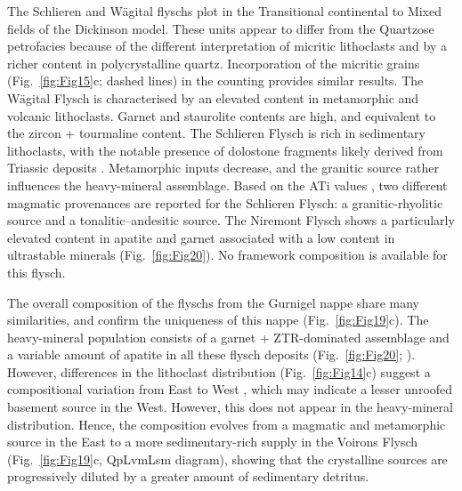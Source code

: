 \documentclass[twoside]{article}
\begin{document}
The Schlieren and Wägital flyschs plot in the Transitional continental to Mixed fields of the Dickinson model. These units appear to differ from the Quartzose petrofacies because of the different interpretation of micritic lithoclasts and by a richer content in polycrystalline quartz. Incorporation of the micritic grains (Fig.~\ref{fig:Fig15}c; dashed lines) in the counting provides similar results. The Wägital Flysch is characterised by an elevated content in metamorphic and volcanic lithoclasts. Garnet and staurolite contents are high, and equivalent to the zircon + tourmaline content. The Schlieren Flysch is rich in sedimentary lithoclasts, with the notable presence of dolostone fragments likely derived from Triassic deposits \citep{Winkler1983,Winkler1984}. Metamorphic inputs decrease, and the granitic source rather influences the heavy-mineral assemblage. Based on the ATi values \citep{Butler2011}, two different magmatic provenances are reported for the Schlieren Flysch: a granitic-rhyolitic source and a tonalitic–andesitic source. The Niremont Flysch shows a particularly elevated content in apatite and garnet associated with a low content in ultrastable minerals (Fig.~\ref{fig:Fig20}). No framework composition is available for this flysch.\par
The overall composition of the flyschs from the Gurnigel nappe share many similarities, and confirm the uniqueness of this nappe (Fig.~\ref{fig:Fig19}c). The heavy-mineral population consists of a garnet + ZTR-dominated assemblage and a variable amount of apatite in all these flysch deposits (Fig.~\ref{fig:Fig20}; \citealp{Wildi1985}). However, differences in the lithoclast distribution (Fig.~\ref{fig:Fig14}c) suggest a compositional variation from East to West \citep{Winkler1984}, which may indicate a lesser unroofed basement source in the West. However, this does not appear in the heavy-mineral distribution. Hence, the composition evolves from a magmatic and metamorphic source in the East to a more sedimentary-rich supply in the Voirons Flysch (Fig.~\ref{fig:Fig19}c, QpLvmLsm diagram), showing that the crystalline sources are progressively diluted by a greater amount of sedimentary detritus.\par
\end{document}
